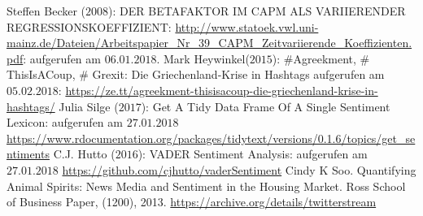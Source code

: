 
	\newpage
	\begin{thebibliography}{12345678}	
	 Steffen Becker ($2008$): DER BETAFAKTOR IM CAPM ALS VARIIERENDER REGRESSIONSKOEFFIZIENT: \url{http://www.statoek.vwl.uni-mainz.de/Dateien/Arbeitspapier_Nr_39_CAPM_Zeitvariierende_Koeffizienten.pdf}: aufgerufen am $06.01.2018$.
	 Mark Heywinkel($2015$): \#Agreekment, \# ThisIsACoup, \# Grexit: Die Griechenland-Krise in Hashtags
	aufgerufen am $05.02.2018$:  \url{https://ze.tt/agreekment-thisisacoup-die-griechenland-krise-in-hashtags/}
	 Julia Silge ($2017$): Get A Tidy Data Frame Of A Single Sentiment Lexicon: aufgerufen am $27.01.2018$ \url{https://www.rdocumentation.org/packages/tidytext/versions/0.1.6/topics/get_sentiments}
	 C.J. Hutto ($2016$): VADER Sentiment Analysis: aufgerufen am $27.01.2018$ \url{https://github.com/cjhutto/vaderSentiment}
	 Cindy K Soo. Quantifying Animal Spirits: News Media and Sentiment in the Housing Market. Ross School of Business Paper, (1200), 2013.
	 \url{https://archive.org/details/twitterstream}
\end{thebibliography}
\clearpage